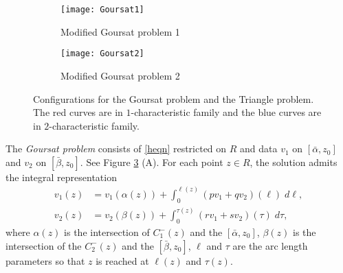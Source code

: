 \documentclass[11pt]{amsart}
\theoremstyle{plain}
\theoremstyle{remark}
\numberwithin{equation}{section}
\numberwithin{Thm}{section}
\begin{document}
\begin{figure}[ht]
\begin{subfigure}[t]{2in}
 \texttt{[image: Goursat1]} 
 \caption{Modified Goursat problem 1} \label{G1}
 \end{subfigure} \quad \quad \quad 
 \begin{subfigure}[t]{2in}
 \centering
 \texttt{[image: Goursat2]}
 \caption{Modified Goursat problem 2} \label{G2}
 \end{subfigure} 
 \caption{Configurations for the Goursat problem and the Triangle problem. The red curves are in $1$-characteristic family and the blue curves are in $2$-characteristic family.} \label{GT}
\end{figure}


The {\it Goursat problem} consists of \eqref{heqn} restricted on $R$ and data $v_1$ on $[\bar\alpha,z_0]$ and $v_2$ on $[\bar\beta,z_0]$. See Figure \ref{GT} (A). For each point $z\in R$, the solution admits the integral representation 
\begin{equation} \label{integral}
\begin{aligned}
 v_1(z) &= v_{1}(\alpha(z)) + \int_0^{\ell(z)} (pv_1 + qv_2)(\ell) \; d\ell, \\
 v_2(z) &= v_{2}(\beta(z)) + \int_0^{\tau(z)} (rv_1 + sv_2)(\tau) \; d\tau, 
\end{aligned}
\end{equation}
where $\alpha(z)$ is the intersection of $C^-_1(z)$ and the $[\bar\alpha,z_0]$, $\beta(z)$ is the intersection of the $C^-_2(z)$ and the $[\bar\beta,z_0]$, $\ell$ and $\tau$ are the arc length parameters so that $z$ is reached at $\ell(z)$ and $\tau(z)$.
\end{document}
